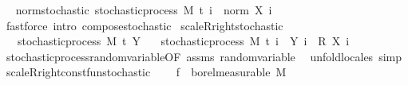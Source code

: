 \begin{isabellebody}
\endisatagproof
{\isafoldproof}%
%
\isadelimproof
\ \isanewline
%
\endisadelimproof
\isanewline
{}\isamarkupfalse%
\ norm{\isacharunderscore}{\kern0pt}stochastic{\isacharcolon}{\kern0pt}\ {\isachardoublequoteopen}stochastic{\isacharunderscore}{\kern0pt}process\ M\ t\ {\isacharparenleft}{\kern0pt}{\isasymlambda}i\ {\isasymxi}{\isachardot}{\kern0pt}\ norm\ {\isacharparenleft}{\kern0pt}X\ i\ {\isasymxi}{\isacharparenright}{\kern0pt}{\isacharparenright}{\kern0pt}{\isachardoublequoteclose}%
\isadelimproof
\ %
\endisadelimproof
%
\isatagproof
{}\isamarkupfalse%
\ {\isacharparenleft}{\kern0pt}fastforce\ intro{\isacharcolon}{\kern0pt}\ compose{\isacharunderscore}{\kern0pt}stochastic{\isacharparenright}{\kern0pt}%
\endisatagproof
{\isafoldproof}%
%
\isadelimproof
%
\endisadelimproof
\isanewline
\isanewline
{}\isamarkupfalse%
\ scaleR{\isacharunderscore}{\kern0pt}right{\isacharunderscore}{\kern0pt}stochastic{\isacharcolon}{\kern0pt}\isanewline
\ \ \ {\isachardoublequoteopen}stochastic{\isacharunderscore}{\kern0pt}process\ M\ t\ Y{\isachardoublequoteclose}\isanewline
\ \ \ {\isachardoublequoteopen}stochastic{\isacharunderscore}{\kern0pt}process\ M\ t\ {\isacharparenleft}{\kern0pt}{\isasymlambda}i\ {\isasymxi}{\isachardot}{\kern0pt}\ {\isacharparenleft}{\kern0pt}Y\ i\ {\isasymxi}{\isacharparenright}{\kern0pt}\ {\isacharasterisk}{\kern0pt}\isactrlsub R\ {\isacharparenleft}{\kern0pt}X\ i\ {\isasymxi}{\isacharparenright}{\kern0pt}{\isacharparenright}{\kern0pt}{\isachardoublequoteclose}\isanewline
%
\isadelimproof
\ \ %
\endisadelimproof
%
\isatagproof
{}\isamarkupfalse%
\ stochastic{\isacharunderscore}{\kern0pt}process{\isachardot}{\kern0pt}random{\isacharunderscore}{\kern0pt}variable{\isacharbrackleft}{\kern0pt}OF\ assms{\isacharbrackright}{\kern0pt}\ random{\isacharunderscore}{\kern0pt}variable\ \isamarkupfalse%
\ {\isacharparenleft}{\kern0pt}unfold{\isacharunderscore}{\kern0pt}locales{\isacharparenright}{\kern0pt}\ simp%
\endisatagproof
{\isafoldproof}%
%
\isadelimproof
\isanewline
%
\endisadelimproof
\isanewline
{}\isamarkupfalse%
\ scaleR{\isacharunderscore}{\kern0pt}right{\isacharunderscore}{\kern0pt}const{\isacharunderscore}{\kern0pt}fun{\isacharunderscore}{\kern0pt}stochastic{\isacharcolon}{\kern0pt}\ \isanewline
\ \ \ {\isachardoublequoteopen}f\ {\isasymin}\ borel{\isacharunderscore}{\kern0pt}measurable\ M{\isachardoublequoteclose}\ \isanewline

\end{isabellebody}

